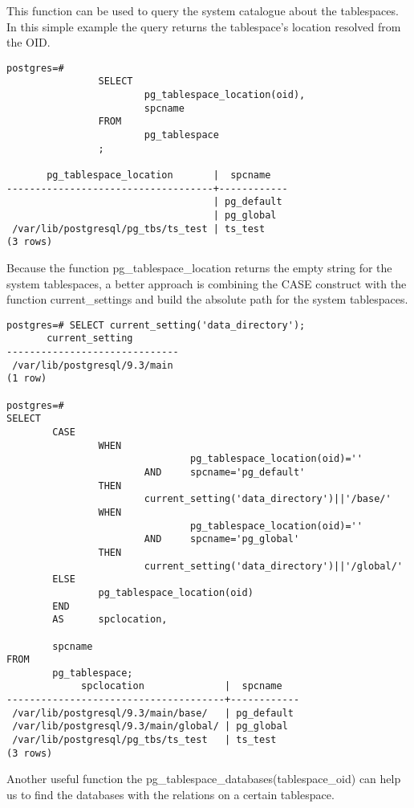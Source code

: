 This function can be used to query the system catalogue about the tablespaces. In this simple example the
query returns the tablespace's location resolved from the OID.

\begin{lstlisting}[style=pgsql]
postgres=#
                SELECT
                        pg_tablespace_location(oid),
                        spcname
                FROM
                        pg_tablespace
                ;

       pg_tablespace_location       |  spcname
------------------------------------+------------
                                    | pg_default
                                    | pg_global
 /var/lib/postgresql/pg_tbs/ts_test | ts_test
(3 rows)

\end{lstlisting}

Because the function pg\_tablespace\_location returns the empty string for the system tablespaces, a better
approach is combining the CASE construct with the function current\_settings and build the absolute path
for the system tablespaces.

\begin{lstlisting}[style=pgsql]
 postgres=# SELECT current_setting('data_directory');
       current_setting
------------------------------
 /var/lib/postgresql/9.3/main
(1 row)

postgres=#
SELECT
        CASE
                WHEN
                                pg_tablespace_location(oid)=''
                        AND     spcname='pg_default'
                THEN
                        current_setting('data_directory')||'/base/'
                WHEN
                                pg_tablespace_location(oid)=''
                        AND     spcname='pg_global'
                THEN
                        current_setting('data_directory')||'/global/'
        ELSE
                pg_tablespace_location(oid)
        END
        AS      spclocation,

        spcname
FROM
        pg_tablespace;
             spclocation              |  spcname
--------------------------------------+------------
 /var/lib/postgresql/9.3/main/base/   | pg_default
 /var/lib/postgresql/9.3/main/global/ | pg_global
 /var/lib/postgresql/pg_tbs/ts_test   | ts_test
(3 rows)

\end{lstlisting}

Another useful function the pg\_tablespace\_databases(tablespace\_oid) can help us to find the databases
with the relations on a certain tablespace.\newline

